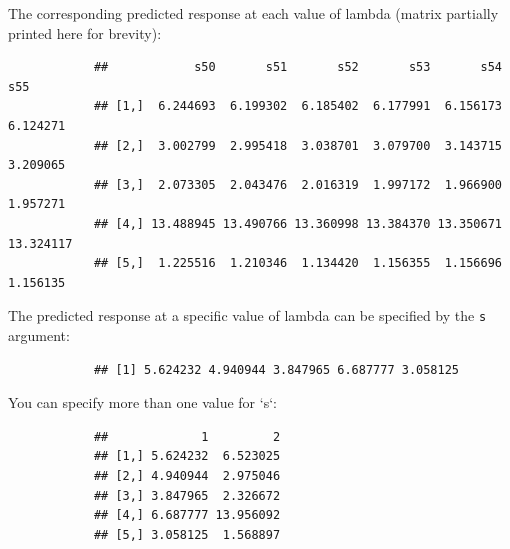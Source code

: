 			
			
			The corresponding predicted response at each value of lambda (matrix partially printed here for brevity):
			
			\begin{knitrout}\scriptsize
			\color{fgcolor}\begin{kframe}
			\begin{alltt}
			\hlstd{(fit)[}\hlopt{:}\hlstd{,}\hlopt{:}\hlstd{]}
			\end{alltt}
			\begin{verbatim}
			##            s50       s51       s52       s53       s54       s55
			## [1,]  6.244693  6.199302  6.185402  6.177991  6.156173  6.124271
			## [2,]  3.002799  2.995418  3.038701  3.079700  3.143715  3.209065
			## [3,]  2.073305  2.043476  2.016319  1.997172  1.966900  1.957271
			## [4,] 13.488945 13.490766 13.360998 13.384370 13.350671 13.324117
			## [5,]  1.225516  1.210346  1.134420  1.156355  1.156696  1.156135
			\end{verbatim}
			\end{kframe}
			\end{knitrout}
			
			
			The predicted response at a specific value of lambda can be specified by the \texttt{s} argument:
			
			\begin{knitrout}\scriptsize
			\color{fgcolor}\begin{kframe}
			\begin{alltt}
			  \hlstd{=} \hlstd{)[}\hlopt{:}\hlstd{, ]}
			\end{alltt}
			\begin{verbatim}
			## [1] 5.624232 4.940944 3.847965 6.687777 3.058125
			\end{verbatim}
			\end{kframe}
			\end{knitrout}
			
			
			You can specify more than one value for `s`:
			
			\begin{knitrout}\scriptsize
			\color{fgcolor}\begin{kframe}
			\begin{alltt}
			  \hlstd{=} \hlstd{(}\hlstd{,} \hlstd{))[}\hlopt{:}\hlstd{, ]}
			\end{alltt}
			\begin{verbatim}
			##             1         2
			## [1,] 5.624232  6.523025
			## [2,] 4.940944  2.975046
			## [3,] 3.847965  2.326672
			## [4,] 6.687777 13.956092
			## [5,] 3.058125  1.568897
			\end{verbatim}
			\end{kframe}
			\end{knitrout}
			
